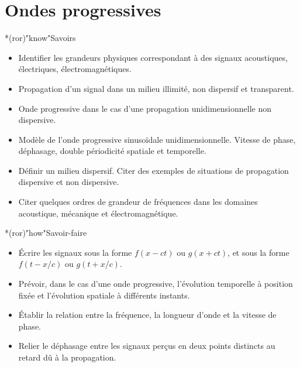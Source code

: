 \documentclass[../../main/main.tex]{subfiles}
\begin{document}
\setcounter{chapter}{0}

\chapter{Ondes progressives}

\vfill

\begin{prgm}
	\begin{tcb}*(ror)"know"{Savoirs}
		\begin{itemize}[label=$\diamond$, leftmargin=10pt]
			\item Identifier les grandeurs physiques correspondant à
			      des signaux acoustiques, électriques, électromagnétiques.
			\item Propagation d'un signal dans un milieu illimité, non dispersif et
			      transparent.
			\item Onde progressive dans le cas d'une propagation unidimensionnelle non
			      dispersive.
			\item Modèle de l'onde progressive sinusoïdale unidimensionnelle. Vitesse
			      de phase, déphasage, double périodicité spatiale et temporelle.
			\item Définir un milieu dispersif. Citer des exemples de situations de
			      propagation dispersive et non dispersive.
			\item Citer quelques ordres de grandeur de fréquences dans les domaines
			      acoustique, mécanique et électromagnétique.
		\end{itemize}
	\end{tcb}
	\begin{tcb}*(ror)"how"{Savoir-faire}
		\begin{itemize}[label=$\diamond$, leftmargin=10pt]
			\item Écrire les signaux sous la forme $f(x-ct)$ ou $g(x+ct)$, et
			      sous la forme $f(t-x/c)$ ou $g(t+x/c)$.
			\item Prévoir, dans le cas d'une onde progressive, l'évolution temporelle
			      à position fixée et l'évolution spatiale à différents instants.
			\item Établir la relation entre la fréquence, la longueur d'onde et la
			      vitesse de phase.
			\item Relier le déphasage entre les signaux perçus en deux points
			      distincts au retard dû à la propagation.
		\end{itemize}
	\end{tcb}
\end{prgm}
\end{document}
